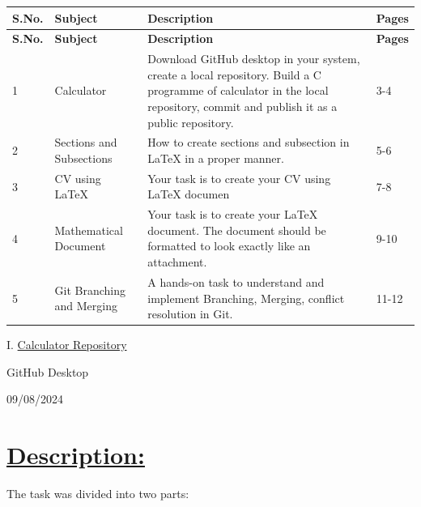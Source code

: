 \documentclass{article}
\begin{document}
\begin{center}
    
\large \begin{longtable}{|p{}|p{}|p{}|p{}|}
    \hline
    \textbf{\Large S.No.} & \textbf{\Large Subject} & \textbf{\Large Description} & \textbf{\Large Pages} \\
    \hline
    \endfirsthead
    \hline
    \textbf{\Large S.No.} & \textbf{\Large Subject} & \textbf{\Large Description} & \textbf{\Large Pages} \\
    \hline
    \endhead
    \hline
    1 & Calculator & Download GitHub desktop in your system, create a local repository. Build a C programme of calculator in the local repository, commit and publish it as a public repository. & 3-4 \\
    \hline
    2 & Sections and Subsections & How to create sections and subsection in LaTeX in a proper manner. & 5-6 \\
    \hline
    3 & CV using LaTeX & Your task is to create your CV using LaTeX documen & 7-8 \\
    \hline
    4 & Mathematical Document & Your task is to create your LaTeX document. 
    The document should be formatted to look exactly like an attachment. & 9-10 \\
    \hline
    5 & Git Branching and Merging & A hands-on task to understand and implement Branching, Merging, conflict resolution in Git. & 11-12 \\
    \hline
    
    
\end{longtable}
\end{center}
\newpage

\begin{center}
    \Huge I. \underline{Calculator Repository}
    \end{center}
    \vspace{1em}

    \begin{center}
        \Large GitHub Desktop
    \end{center}

    \vspace{0.4em}
    
    \begin{center}
        \large 09/08/2024
    \end{center}


\section{\underline{Description:}}
The task was divided into two parts: \vspace{0.2cm}\newline
\end{document}
